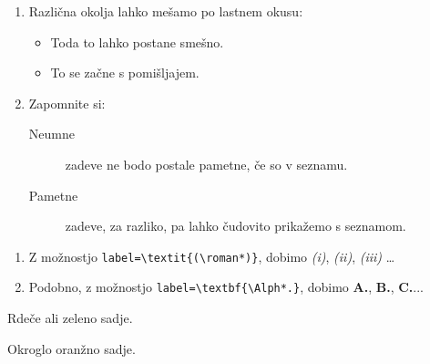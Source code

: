 \documentclass{article}
\begin{document}
\vspace{2cm}

\begin{enumerate}
  \item Različna okolja lahko mešamo
  po lastnem okusu:
    \begin{itemize}
      \item Toda to lahko postane smešno.
      \item[-] To se začne s pomišljajem.
    \end{itemize}
  \item Zapomnite si:
    \begin{description}
      \item[Neumne] zadeve ne bodo postale pametne, 
      če so v seznamu.
      \item[Pametne] zadeve, za razliko, pa lahko čudovito 
      prikažemo s seznamom.
    \end{description}
\end{enumerate}


\clearpage

\begin{enumerate}[label=\alph*)]
  \item Z možnostjo \texttt{label=\textbackslash textit\{(\textbackslash roman*)\}}, dobimo \textit{(i)}, \textit{(ii)}, \textit{(iii)} \dots
  \item Podobno, z možnostjo \texttt{label=\textbackslash textbf\{\textbackslash Alph*.\}}, dobimo \textbf{A.}, \textbf{B.}, \textbf{C.}...
\end{enumerate}

\vspace{2cm}

\vspace{2cm}
\begin{description}[style=nextline]
  \item[Jabolko] Rdeče ali zeleno sadje.
  \item[Pomaranča] Okroglo oranžno sadje.
\end{description}
\end{document}
